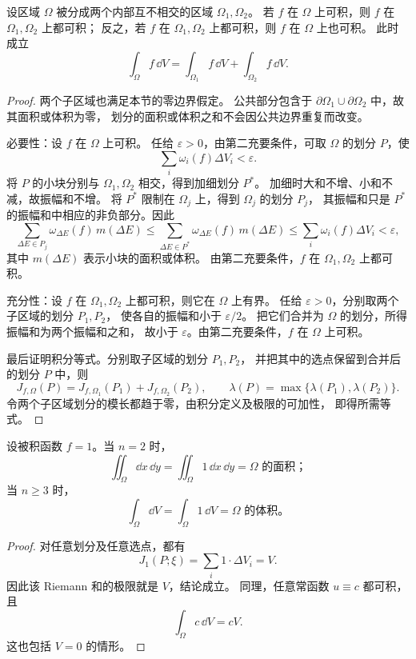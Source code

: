 \begin{proposition}[区域可加性]\label{p2-integral-domain-additivity}
设区域 $\Omega$ 被分成两个内部互不相交的区域 $\Omega_1,\Omega_2$。
若 $f$ 在 $\Omega$ 上可积，则 $f$ 在 $\Omega_1,\Omega_2$ 上都可积；
反之，若 $f$ 在 $\Omega_1,\Omega_2$ 上都可积，则 $f$ 在 $\Omega$ 上也可积。
此时成立
\[
\int_\Omega f\,\dd V
=\int_{\Omega_1}f\,\dd V+\int_{\Omega_2}f\,\dd V.
\]
\end{proposition}
\begin{proof}
两个子区域也满足本节的零边界假定。
公共部分包含于 $\partial\Omega_1\cup\partial\Omega_2$ 中，故其面积或体积为零，
划分的面积或体积之和不会因公共边界重复而改变。

必要性：设 $f$ 在 $\Omega$ 上可积。
任给 $\varepsilon>0$，由第二充要条件，可取 $\Omega$ 的划分 $P$，使
\[
\sum_i\omega_i(f)\Delta V_i<\varepsilon.
\]
将 $P$ 的小块分别与 $\Omega_1,\Omega_2$ 相交，得到加细划分 $P^*$。
加细时大和不增、小和不减，故振幅和不增。
将 $P^*$ 限制在 $\Omega_j$ 上，得到 $\Omega_j$ 的划分 $P_j$，
其振幅和只是 $P^*$ 的振幅和中相应的非负部分。因此
\[
\sum_{\Delta E\in P_j}\omega_{\Delta E}(f)\,m(\Delta E)
\le\sum_{\Delta E\in P^*}\omega_{\Delta E}(f)\,m(\Delta E)
\le\sum_i\omega_i(f)\Delta V_i<\varepsilon,
\]
其中 $m(\Delta E)$ 表示小块的面积或体积。
由第二充要条件，$f$ 在 $\Omega_1,\Omega_2$ 上都可积。

充分性：设 $f$ 在 $\Omega_1,\Omega_2$ 上都可积，则它在 $\Omega$ 上有界。
任给 $\varepsilon>0$，分别取两个子区域的划分 $P_1,P_2$，
使各自的振幅和小于 $\varepsilon/2$。
把它们合并为 $\Omega$ 的划分，所得振幅和为两个振幅和之和，
故小于 $\varepsilon$。由第二充要条件，$f$ 在 $\Omega$ 上可积。

最后证明积分等式。分别取子区域的划分 $P_1,P_2$，
并把其中的选点保留到合并后的划分 $P$ 中，则
\[
J_{f,\Omega}(P)
=J_{f,\Omega_1}(P_1)+J_{f,\Omega_2}(P_2),
\qquad
\lambda(P)=\max\{\lambda(P_1),\lambda(P_2)\}.
\]
令两个子区域划分的模长都趋于零，由积分定义及极限的可加性，
即得所需等式。
\end{proof}

\begin{proposition}[常函数的积分]\label{p2-integral-constant}
设被积函数 $f=1$。当 $n=2$ 时，
\[
\iint_\Omega\dd x\,\dd y
=\iint_\Omega1\,\dd x\,\dd y
=\Omega\text{ 的面积；}
\]
当 $n\ge3$ 时，
\[
\int_\Omega\dd V=\int_\Omega1\,\dd V
=\Omega\text{ 的体积。}
\]
\end{proposition}
\begin{proof}
对任意划分及任意选点，都有
\[
J_1(P;\xi)=\sum_i1\cdot\Delta V_i=V.
\]
因此该 Riemann 和的极限就是 $V$，结论成立。
同理，任意常函数 $u\equiv c$ 都可积，且
\[
\int_\Omega c\,\dd V=cV.
\]
这也包括 $V=0$ 的情形。
\end{proof}


